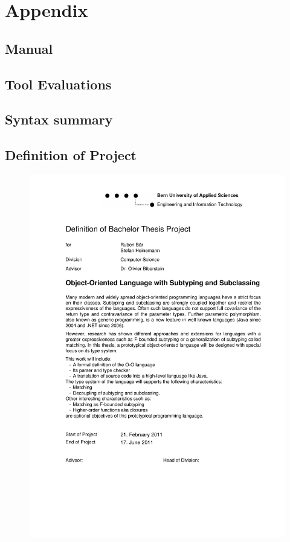 
\appendix
\part{Appendix}

\chapter{Manual}

\chapter{Tool Evaluations}

\chapter{Syntax summary}

\chapter{Definition of Project}
\begin{figure}[H]
\centering
\includegraphics[height=\textheight,keepaspectratio=true]{../proposal}
\end{figure}

